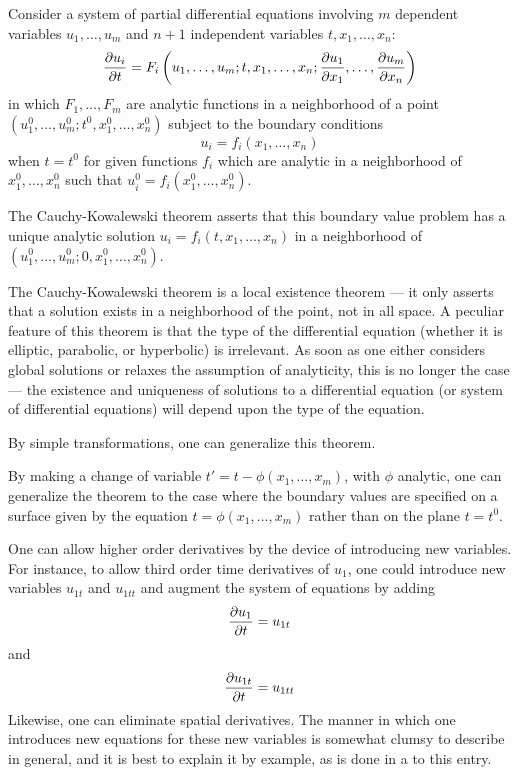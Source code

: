 \documentclass[12pt]{article}
\begin{document}
Consider a system of partial differential equations involving $m$ dependent variables $u_1, \ldots, u_m$ and $n+1$ independent variables $t, x_1, \ldots, x_n$:
 $${\partial u_i \over \partial t} = F_i \left( u_1, \ldots, u_m; t, x_1, \ldots, x_n; {\partial u_1 \over \partial x_1}, \ldots, {\partial u_m \over \partial x_n} \right)$$
in which $F_1 ,\ldots, F_m$ are analytic functions in a neighborhood of a point $(u_1^0, \ldots, u_m^0; t^0, x_1^0, \ldots, x_n^0)$ subject to the boundary
conditions
 $$u_i = f_i (x_1, \ldots, x_n)$$
when $t = t^0$ for given functions $f_i$ which are analytic in a neighborhood of $x_1^0, \ldots, x_n^0$ such that $u_i^0 = f_i (x^0_1, \ldots, x^0_n)$.

The Cauchy-Kowalewski theorem asserts that this boundary value problem has a unique analytic solution $u_i = f_i (t,x_1, \ldots, x_n)$ in a neighborhood of $(u_1^0, \ldots, u_m^0; 0, x_1^0, \ldots, x_n^0)$.

The Cauchy-Kowalewski theorem is a local existence theorem --- it only asserts that a solution exists in a neighborhood of the point, not in all space.  A peculiar feature of this theorem is that the type of the differential equation (whether it is elliptic, parabolic, or hyperbolic) is irrelevant.  As soon as one either considers global solutions or relaxes the assumption of analyticity, this is no longer the case --- the existence and uniqueness of solutions to a differential equation (or system of differential equations) will depend upon the type of the equation.

By simple transformations, one can generalize this theorem.

By making a change of variable $t' = t - \phi (x_1, \ldots, x_m)$, with $\phi$ analytic, one can generalize the theorem to the case where the boundary values are specified on a surface given by the equation $t = \phi (x_1, \ldots, x_m)$ rather than on the plane $t = t^0$.

One can allow higher order derivatives by the device of introducing new variables.  For instance, to allow third order time derivatives of $u_1$, one could introduce new variables $u_{1t}$ and $u_{1tt}$ and augment the system of equations by adding
 $${\partial u_1 \over \partial t} = u_{1t}$$
and
 $${\partial u_{1t} \over \partial t} = u_{1tt}$$
Likewise, one can eliminate spatial derivatives.  The manner in which one introduces new equations for these new variables is somewhat clumsy to describe in general, and it is best to explain it by example, as is done in a  to this entry.
\end{document}
